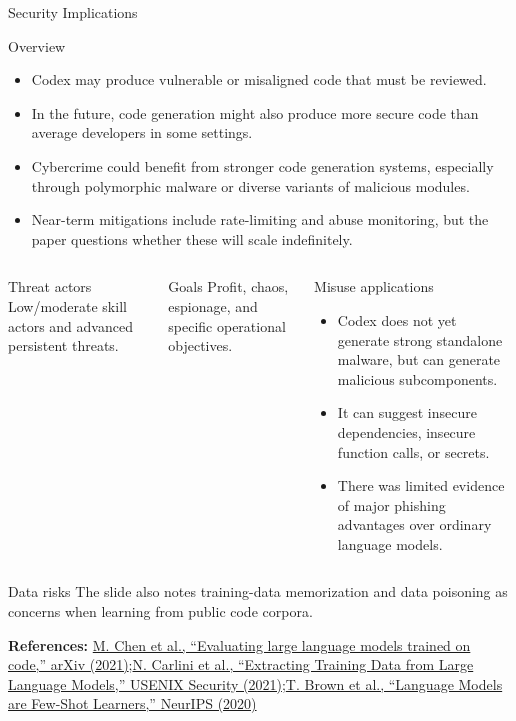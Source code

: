 \documentclass[aspectratio=43,9pt]{beamer}
\newcommand{\srclink}[2]{\href{#2}{\textcolor{black!68}{#1}}}
\newcommand{\sep}{;\hspace{0.35em}}
\newcommand{\refline}[2][References]{%
  \vfill
  {\raggedright\fontsize{5.1}{5.5}\selectfont\color{black!68}\textbf{#1:} #2\par}%
}
\newcommand{\srcChen}{\srclink{M. Chen et al., ``Evaluating large language models trained on code,'' arXiv (2021)}{https://arxiv.org/abs/2107.03374}}
\newcommand{\srcBrown}{\srclink{T. Brown et al., ``Language Models are Few-Shot Learners,'' NeurIPS (2020)}{https://arxiv.org/abs/2005.14165}}
\newcommand{\srcCarlini}{\srclink{N. Carlini et al., ``Extracting Training Data from Large Language Models,'' USENIX Security (2021)}{https://www.usenix.org/conference/usenixsecurity21/presentation/carlini-extracting-training-data}}
\begin{document}
\begin{frame}{Security Implications}
\tiny
\begin{block}{Overview}
\begin{itemize}
  \item Codex may produce vulnerable or misaligned code that must be reviewed.
  \item In the future, code generation might also produce more secure code than average developers in some settings.
  \item Cybercrime could benefit from stronger code generation systems, especially through polymorphic malware or diverse variants of malicious modules.
  \item Near-term mitigations include rate-limiting and abuse monitoring, but the paper questions whether these will scale indefinitely.
\end{itemize}
\end{block}

\begin{columns}[T,totalwidth=\textwidth]
\begin{block}{Threat actors}
Low/moderate skill actors and advanced persistent threats.
\end{block}

\begin{block}{Goals}
Profit, chaos, espionage, and specific operational objectives.
\end{block}

\begin{block}{Misuse applications}
\begin{itemize}
  \item Codex does not yet generate strong standalone malware, but can generate malicious subcomponents.
  \item It can suggest insecure dependencies, insecure function calls, or secrets.
  \item There was limited evidence of major phishing advantages over ordinary language models.
\end{itemize}
\end{block}
\end{columns}

\begin{block}{Data risks}
The slide also notes training-data memorization and data poisoning as concerns when learning from public code corpora.
\end{block}

\refline{\srcChen\sep \srcCarlini\sep \srcBrown}
\end{frame}
\end{document}
